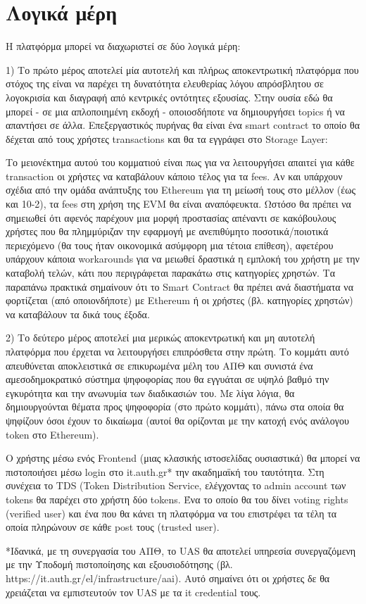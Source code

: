 \section{Λογικά μέρη} \label{section:3-1-logical-parts}

Η πλατφόρμα μπορεί να διαχωριστεί σε δύο λογικά μέρη:

1) Το πρώτο μέρος αποτελεί μία αυτοτελή και πλήρως αποκεντρωτική πλατφόρμα που στόχος της είναι να παρέχει τη δυνατότητα ελευθερίας λόγου απρόσβλητου σε λογοκρισία και διαγραφή από κεντρικές οντότητες εξουσίας. Στην ουσία εδώ θα μπορεί - σε μια απλοποιημένη εκδοχή - οποιοσδήποτε να δημιουργήσει topics ή να απαντήσει σε άλλα. Επεξεργαστικός πυρήνας θα είναι ένα smart contract το οποίο θα δέχεται από τους χρήστες transactions και θα τα εγγράφει στο Storage Layer:


Το μειονέκτημα αυτού του κομματιού είναι πως για να λειτουργήσει απαιτεί για κάθε \textenglish{transaction} οι χρήστες να καταβάλουν κάποιο τέλος για τα fees. Αν και υπάρχουν σχέδια από την ομάδα ανάπτυξης του Ethereum για τη μείωσή τους στο μέλλον (έως και 10-2), τα fees στη χρήση της EVM θα είναι αναπόφευκτα. Ωστόσο θα πρέπει να σημειωθεί ότι αφενός παρέχουν μια μορφή προστασίας απέναντι σε κακόβουλους χρήστες που θα πλημμύριζαν την εφαρμογή με ανεπιθύμητο ποσοτικά/ποιοτικά περιεχόμενο (θα τους ήταν οικονομικά ασύμφορη μια τέτοια επίθεση), αφετέρου υπάρχουν κάποια workarounds για να μειωθεί δραστικά η εμπλοκή του χρήστη με την καταβολή τελών, κάτι που περιγράφεται παρακάτω στις κατηγορίες χρηστών. Τα παραπάνω πρακτικά σημαίνουν ότι το Smart Contract θα πρέπει ανά διαστήματα να φορτίζεται (από οποιονδήποτε) με Ethereum ή οι χρήστες (βλ. κατηγορίες χρηστών) να καταβάλουν τα δικά τους έξοδα.

2) Το δεύτερο μέρος αποτελεί μια μερικώς αποκεντρωτική και μη αυτοτελή πλατφόρμα που έρχεται να λειτουργήσει επιπρόσθετα στην πρώτη. Το κομμάτι αυτό απευθύνεται αποκλειστικά σε επικυρωμένα μέλη του ΑΠΘ και συνιστά ένα αμεσοδημοκρατικό σύστημα ψηφοφορίας που θα εγγυάται σε υψηλό βαθμό την εγκυρότητα και την ανωνυμία των διαδικασιών του. Με λίγα λόγια, θα δημιουργούνται θέματα προς ψηφοφορία (στο πρώτο κομμάτι), πάνω στα οποία θα ψηφίζουν όσοι έχουν το δικαίωμα (αυτοί θα ορίζονται με την κατοχή ενός ανάλογου token στο Ethereum).


O χρήστης μέσω ενός Frontend (μιας κλασικής ιστοσελίδας ουσιαστικά) θα μπορεί να πιστοποιήσει μέσω login στο it.auth.gr* την ακαδημαϊκή του ταυτότητα. Στη συνέχεια το TDS (Token Distribution Service, ελέγχοντας το admin account των tokens θα παρέχει στο χρήστη δύο tokens.  Ένα το οποίο θα του δίνει voting rights (verified user) και ένα που θα κάνει τη πλατφόρμα να του επιστρέφει τα τέλη τα οποία πληρώνουν σε κάθε post τους (trusted user).


*Ιδανικά, με τη συνεργασία του ΑΠΘ, το UAS θα αποτελεί υπηρεσία συνεργαζόμενη με την Υποδομή πιστοποίησης και εξουσιοδότησης (βλ. https://it.auth.gr/el/infrastructure/aai). Αυτό σημαίνει ότι οι χρήστες δε θα χρειάζεται να εμπιστευτούν τον UAS με τα it credential τους.
